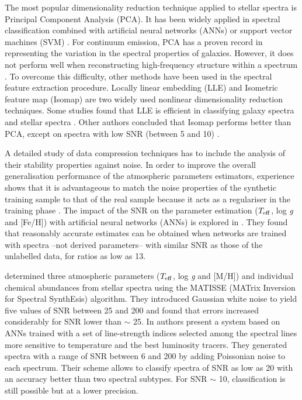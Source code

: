 \documentclass[a4paper,fleqn,usenatbib]{mnras}
\begin{document}
The most popular dimensionality reduction technique applied to stellar
spectra is Principal Component Analysis (PCA). It has been widely
applied in spectral classification combined with artificial neural
networks (ANNs) \citep{singh:98} or support vector machines (SVM)
\citep{fiorentin:08b}. For continuum emission, PCA has a proven record
in representing the variation in the spectral properties of
galaxies. However, it does not perform well when reconstructing
high-frequency structure within a spectrum \citep{vanderplas:09}. To
overcome this difficulty, other methods have been used in the spectral
feature extraction procedure. Locally linear embedding (LLE)
\citep{roweisLLE:00} and Isometric feature map (Isomap)
\citep{tenenbaum:00} are two widely used nonlinear dimensionality
reduction techniques. Some studies found that LLE is efficient in
classifying galaxy spectra \citep{vanderplas:09} and stellar spectra
\citep{daniel:11}. Other authors concluded that Isomap performs better
than PCA, except on spectra with low SNR (between 5 and 10)
\citep{bu:14}.

A detailed study of data compression techniques has to include the
analysis of their stability properties against noise. In order to
improve the overall generalisation performance of the atmospheric
parameters estimators, experience shows that it is advantageous to
match the noise properties of the synthetic training sample to that of
the real sample because it acts as a regulariser in the training phase
\citep{fiorentin:08a}.  The impact of the SNR on the parameter
estimation ($T_{\rm eff}$, log \textit{g} and [Fe/H]) with artificial
neural networks (ANNs) is explored in \cite{snider:01}. They found
that reasonably accurate estimates can be obtained when networks are
trained with spectra --not derived parameters-- with similar SNR as
those of the unlabelled data, for ratios as low as 13.

\cite{recio:06} determined three atmospheric parameters
($T_{\rm eff}$, log \textit{g} and [M/H]) and individual chemical
abundances from stellar spectra using the MATISSE (MATrix
Inversion for Spectral SynthEsis) algorithm. They introduced Gaussian
white noise to yield five values of SNR between 25 and 200 and found
that errors increased considerably for SNR lower than $\sim$ 25.  In
\cite{navarro:12} authors present a system based on ANNs trained with
a set of line-strength indices selected among the spectral lines more
sensitive to temperature and the best luminosity tracers. They
generated spectra with a range of SNR between 6 and 200 by adding
Poissonian noise to each spectrum. Their scheme allows to classify
spectra of SNR as low as 20 with an accuracy better than two spectral
subtypes. For SNR $\sim$ 10, classification is still possible but at a
lower precision.
\end{document}
